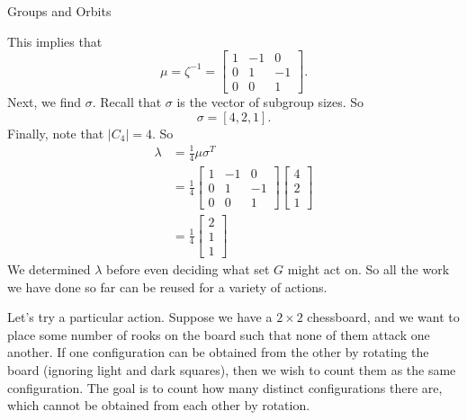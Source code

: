 \documentclass[12pt]{pom_thesis}
\begin{document}
\begin{chapter}{Groups and Orbits}
\begin{examp}
This implies that
\[
\mu = \zeta^{-1} = \begin{bmatrix} 1 & -1 & 0\\ 0 & 1 & -1 \\ 0 & 0 & 1 \end{bmatrix}.
\]
Next, we find $\sigma$. Recall that $\sigma$ is the vector of subgroup sizes. So 
\[
\sigma = [4, 2, 1].
\]
Finally, note that $|C_4|=4$. So
\begin{align*}
\lambda &= \frac 14 \mu \sigma^T\\
&= \frac 14 
\begin{bmatrix} 1 & -1 & 0\\ 0 & 1 & -1 \\ 0 & 0 & 1 \end{bmatrix}
\begin{bmatrix} 4 \\ 2 \\ 1 \end{bmatrix}\\
&= \frac 14 \begin{bmatrix} 2 \\ 1 \\ 1\end{bmatrix}
\end{align*}
We determined $\lambda$ before even deciding what set $G$ might act on. So all the work we have done so far can be reused for a variety of actions.

Let's try a particular action. Suppose we have a $2 \times 2$ chessboard, and we want to place some number of rooks on the board such that none of them attack one another. If one configuration can be obtained from the other by rotating the board (ignoring light and dark squares), then we wish to count them as the same configuration. The goal is to count how many distinct configurations there are, which cannot be obtained from each other by rotation.


\end{examp}
\end{chapter}
\end{document}
